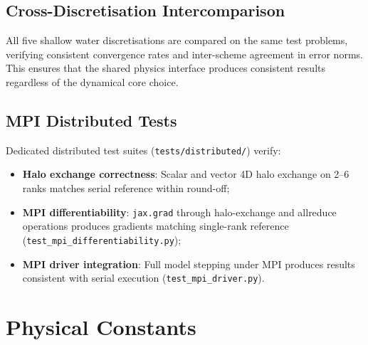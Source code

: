 \documentclass[11pt,twoside]{report}
\begin{document}
\section{Cross-Discretisation Intercomparison}

All five shallow water discretisations are compared on the same test
problems, verifying consistent convergence rates and inter-scheme
agreement in error norms.  This ensures that the shared physics interface
produces consistent results regardless of the dynamical core choice.

\section{MPI Distributed Tests}

Dedicated distributed test suites (\texttt{tests/distributed/}) verify:
\begin{itemize}[nosep]
  \item \textbf{Halo exchange correctness}: Scalar and vector 4D halo
    exchange on 2--6 ranks matches serial reference within round-off;
  \item \textbf{MPI differentiability}: \texttt{jax.grad} through
    halo-exchange and allreduce operations produces gradients matching
    single-rank reference (\texttt{test\_mpi\_differentiability.py});
  \item \textbf{MPI driver integration}: Full model stepping under MPI
    produces results consistent with serial execution
    (\texttt{test\_mpi\_driver.py}).
\end{itemize}


\chapter{Physical Constants}
\label{ch:constants}
\end{document}
